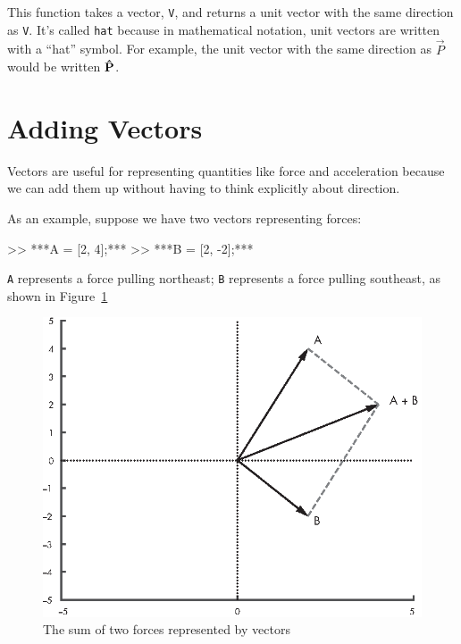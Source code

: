 This function takes a vector, \lstinline{V}, and returns a unit vector with the same direction as \lstinline{V}.  It's called \lstinline{hat} because in mathematical notation, unit vectors are written with a ``hat'' symbol.  
For example, the unit vector with the same direction as $\vec{P}$ would be written $\uvec{P}$. 


\section{Adding Vectors}

Vectors are useful for representing quantities like force and acceleration because we can add them up without having to think explicitly about direction.


As an example, suppose we have two vectors representing forces:

\begin{code}
>> ***A = [2, 4];***
>> ***B = [2, -2];***
\end{code}

\lstinline{A} represents a force pulling northeast; \lstinline{B} represents a force pulling southeast, as shown in Figure~\ref{fig:vector2}

\begin{figure}[ht]
\includegraphics{book/images/figure12_01_new.eps}
\caption{The sum of two forces represented by vectors}
\label{fig:vector2}
\end{figure}

